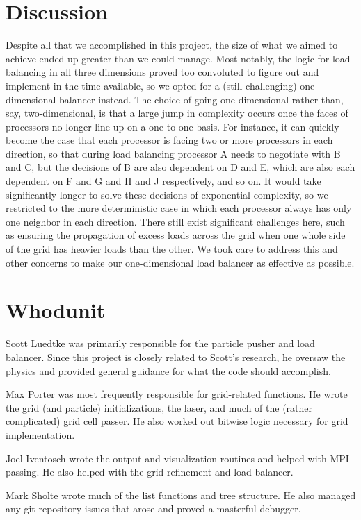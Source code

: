\documentclass[]{article}
\begin{document}
\section{Discussion}
Despite all that we accomplished in this project, the size of what we aimed to achieve ended up greater than we could manage. Most notably, the logic for load balancing in all three dimensions proved too convoluted to figure out and implement in the time available, so we opted for a (still challenging) one-dimensional balancer instead. The choice of going one-dimensional rather than, say, two-dimensional, is that a large jump in complexity occurs once the faces of processors no longer line up on a one-to-one basis. For instance, it can quickly become the case that each processor is facing two or more processors in each direction, so that during load balancing processor A needs to negotiate with B and C, but the decisions of B are also dependent on D and E, which are also each dependent on F and G and H and J respectively, and so on. It would take significantly longer to solve these decisions of exponential complexity, so we restricted to the more deterministic case in which each processor always has only one neighbor in each direction. There still exist significant challenges here, such as ensuring the propagation of excess loads across the grid when one whole side of the grid has heavier loads than the other. We took care to address this and other concerns to make our one-dimensional load balancer as effective as possible.

\section{Whodunit}
Scott Luedtke was primarily responsible for the particle pusher and load balancer.  Since this project is closely related to Scott's research, he oversaw the physics and provided general guidance for what the code should accomplish.

Max Porter was most frequently responsible for grid-related functions. He wrote the grid (and particle) initializations, the laser, and much of the (rather complicated) grid cell passer. He also worked out bitwise logic necessary for grid implementation.

Joel Iventosch wrote the output and visualization routines and helped with MPI passing.  He also helped with the grid refinement and load balancer.

Mark Sholte wrote much of the list functions and tree structure.  He also managed any git repository issues that arose and proved a masterful debugger.
\end{document}
